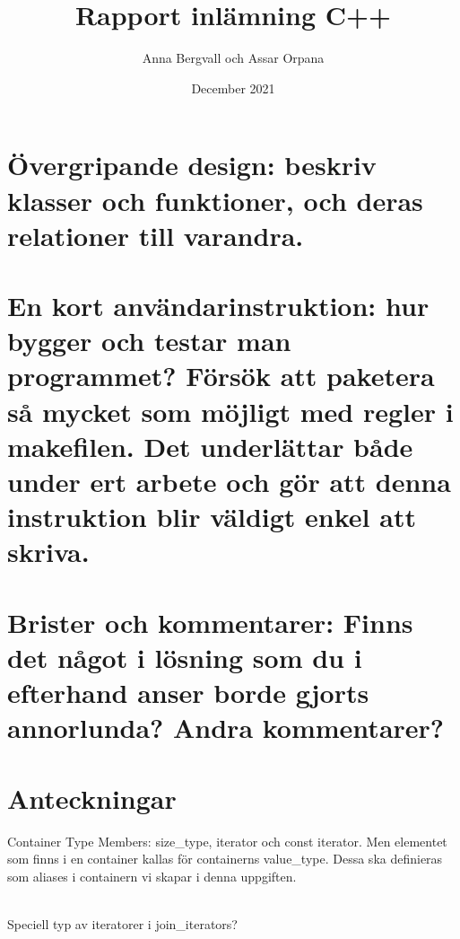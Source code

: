 \documentclass{article}
\title{Rapport inlämning C++}
\author{Anna Bergvall och Assar Orpana}
\date{December 2021}
\begin{document}
\maketitle

\section{Övergripande design: beskriv klasser och funktioner, och deras relationer till varandra.}

\section{En kort användarinstruktion: hur bygger och testar man programmet? Försök att paketera
så mycket som möjligt med regler i makefilen. Det underlättar både under ert arbete och
gör att denna instruktion blir väldigt enkel att skriva.}

\section{Brister och kommentarer: Finns det något i lösning som du i efterhand anser borde gjorts
annorlunda? Andra kommentarer?}

\section{Anteckningar}

Container Type Members: size\_type, iterator och const iterator. Men elementet som finns i en container kallas för containerns value\_type. Dessa ska definieras som aliases i containern vi skapar i denna uppgiften.

\\

Speciell typ av iteratorer i join\_iterators?
\end{document}
